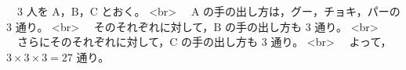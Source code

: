 　$3$ 人を $\mathrm{A}$，$\mathrm{B}$，$\mathrm{C}$ とおく。 <br>
　$\mathrm{A}$ の手の出し方は，グー，チョキ，パーの $3$ 通り。 <br>
　そのそれぞれに対して，$\mathrm{B}$ の手の出し方も $3$ 通り。 <br>
　さらにそのそれぞれに対して，$\mathrm{C}$ の手の出し方も $3$ 通り。 <br>
　よって，$3 \times 3 \times 3 = 27$ 通り。